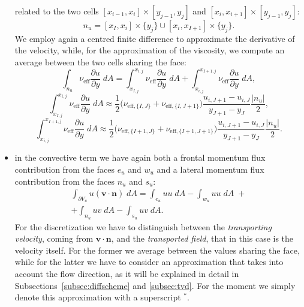 \begin{itemize}
	related to the two cells $[x_{i-1},x_i]\times[y_{j-1},y_j]$ and 
	$[x_i,x_{i+1}]\times[y_{j-1},y_j]$:
	\begin{equation}
	n_u = [x_I,x_i]\times \{y_j\} \cup [x_i,x_{I+1}] \times \{y_j\}.
	\end{equation}
	We employ again a centred finite difference to approximate the 
	derivative of the velocity, while, for the approximation of the viscosity, 
	we compute an average between the two cells sharing the face:
	\begin{equation}
	\int_{n_u} \nu_\text{eff} \frac{\partial u}{\partial y} \; dA = 
	\int_{x_{I,j}}^{x_{i,j}} \nu_\text{eff} \frac{\partial u}{\partial y} \; dA 
	+\int_{x_{i,j}}^{x_{I+1,j}} \nu_\text{eff} \frac{\partial u}{\partial y} \; 
	dA,
	\end{equation}
	\begin{equation*}
	\int_{x_{I,j}}^{x_{i,j}} \nu_\text{eff} \frac{\partial u}{\partial y} \; dA 
	\approx \frac{1}{2}\big(\nu_{\text{eff},\{I,J\}}+\nu_{\text{eff},\{I,J+1\}} 
	\big) \frac{u_{i,J+1}-u_{i,J}}{y_{J+1}-y_J} \frac{|n_u|}{2},
	\end{equation*}
	\begin{equation*}
	\int_{x_{i,j}}^{x_{I+1,j}} \nu_\text{eff} \frac{\partial u}{\partial y} \; 
	dA \approx \frac{1}{2}\big( \nu_{\text{eff},\{I+1,J\}}+ 
	\nu_{\text{eff},\{I+1,J+1\}} \big) \frac{u_{i,J+1}-u_{i,J}}{y_{J+1}-y_J} 
	\frac{|n_u|}{2}.
	\end{equation*}
	\item in the convective term we have again both a frontal momentum flux 
	contribution from the faces $e_u$ and $w_u$ and a lateral momentum flux 
	contribution from the faces $n_u$ and $s_u$:
	\begin{multline}
	\int_{\partial V_u} u (\mathbf{v} \cdot \mathbf{n}) \; dA = \int_{e_u} u u 
	\; dA - \int_{w_u} u u \; dA \; +\\
	+ \int_{n_u} u v \; dA  -\int_{s_u} u v \; dA.
	\end{multline}
	For the discretization we have to distinguish between the 
	\emph{transporting velocity}, coming from $\mathbf{v} \cdot \mathbf{n}$, 
	and the \emph{transported field}, that in this case is the velocity itself. 
	For the former we average between the values sharing the face, 
	while for the latter we have to consider an approximation that takes into 
	account the flow direction, as it will be explained in detail in 
	Subsections~\ref{subsec:diffscheme} and \ref{subsec:tvd}. For the moment we 
	simply denote this approximation with a superscript $^*$.

\end{itemize}
